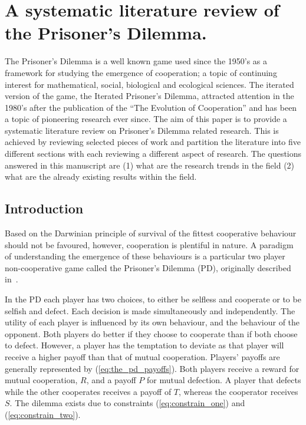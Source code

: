 \chapter{A systematic literature review of the Prisoner's Dilemma.}\label{chapter:literature_review}

    The Prisoner's Dilemma is a well known game used since the 1950's as a
    framework for studying the emergence of cooperation; a topic of continuing
    interest for mathematical, social, biological and ecological sciences. The
    iterated version of the game, the Iterated Prisoner's Dilemma, attracted
    attention in the 1980's after the publication of the ``The Evolution of
    Cooperation'' and has been a topic of pioneering research ever since. The
    aim of this paper is to provide a systematic literature review on Prisoner's
    Dilemma related research. This is achieved by reviewing selected pieces of
    work and partition the literature into five different sections with each
    reviewing a different aspect of research. The questions answered in this
    manuscript are (1) what are the research trends in the field (2) what are
    the already existing results within the field.

\section{Introduction}\label{section:introduction}

Based on the Darwinian principle of survival of the fittest cooperative behaviour
should not be favoured, however, cooperation is plentiful in nature.
A paradigm of understanding the emergence of these behaviours is
a particular two player non-cooperative game called the Prisoner's Dilemma (PD),
originally described in~\cite{Flood1958}.

In the PD each player has two choices, to either be selfless and cooperate or to
be selfish and defect. Each decision is made simultaneously and
independently. The utility of each player is influenced by its own behaviour,
and the behaviour of the opponent. Both players do better if they choose to
cooperate than if both choose to defect. However, a player has the temptation to
deviate as that player will receive a higher payoff than that of mutual
cooperation.
Players' payoffs are generally represented by (\ref{eq:the_pd_payoffs}). Both
players receive a reward for mutual cooperation, \(R\), and a payoff \(P\) for
mutual defection. A player that defects while the other cooperates receives a payoff of
\(T\), whereas the cooperator receives \(S\). The dilemma exists due
to constraints (\ref{eq:constrain_one}) and (\ref{eq:constrain_two}).

